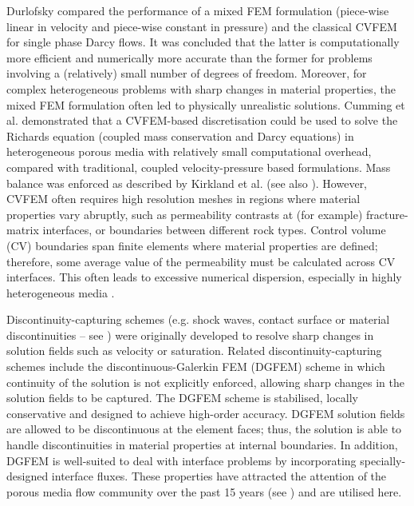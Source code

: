 \documentclass[times]{fldauth}
\begin{document}
Durlofsky \cite{durlofsky_1993,durlofsky_1994} compared the performance of a
mixed FEM formulation (piece-wise linear in velocity and piece-wise
constant in pressure) and the classical CVFEM for single phase Darcy
flows. It was concluded that the latter is computationally more
efficient and numerically more accurate than the former for problems
involving a (relatively) small number of degrees of freedom. Moreover,
for complex heterogeneous problems with sharp changes in material
properties, the mixed FEM formulation often led to physically
unrealistic solutions.  Cumming et al. \cite{cumming_2011} demonstrated that a
CVFEM-based discretisation could be used to solve the Richards
equation (coupled mass conservation and Darcy equations) in
heterogeneous porous media with relatively small computational
overhead, compared with traditional, coupled velocity-pressure based
formulations.  Mass balance was enforced as described by Kirkland et al.
\cite{kirkland_1992} (see also \cite{forsyth_1990,cumming_phd2012}). However, CVFEM often requires
high resolution meshes in regions where material properties vary
abruptly, such as permeability contrasts at (for example)
fracture-matrix interfaces, or boundaries between different rock
types. Control volume (CV) boundaries span finite elements where
material properties are defined; therefore, some average value of the
permeability must be calculated across CV interfaces. This often leads
to excessive numerical dispersion, especially in highly heterogeneous
media \cite{nick_2011b, nick_2011a}.

Discontinuity-capturing schemes (e.g. shock waves, contact
  surface or material discontinuities --
  see \cite{brooks_1982,tezduyar_1986}) were originally developed to
resolve sharp changes in solution fields such as velocity or
saturation. Related discontinuity-capturing schemes include the
discontinuous-Galerkin FEM (DGFEM) scheme in which continuity of the
solution is not explicitly enforced, allowing sharp changes in the
solution fields to be captured. The DGFEM scheme is stabilised,
locally conservative and designed to achieve high-order
accuracy. DGFEM solution fields are allowed to be discontinuous at the
element faces; thus, the solution is able to handle discontinuities in
material properties at internal boundaries. In addition, DGFEM is
well-suited to deal with interface problems by incorporating
specially-designed interface fluxes. These properties have attracted
the attention of the porous media flow community over the past 15
years (see \cite{riviere_2000,riviere_2002,bastian_2002}) and are
utilised here.
\end{document}
